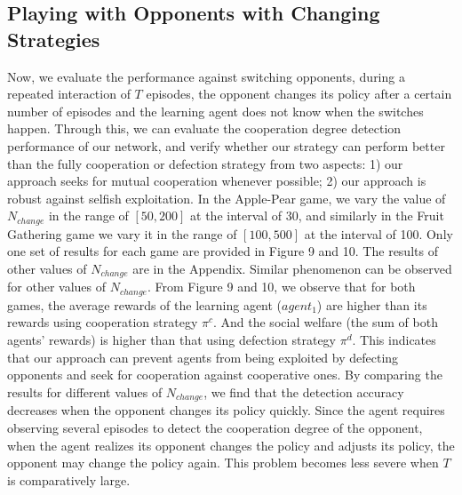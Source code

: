 \documentclass{article}
\begin{document}
\subsection{Playing with Opponents with Changing Strategies}
Now, we evaluate the performance against switching opponents, during a repeated interaction of $T$ episodes, the opponent changes its policy after a certain number of episodes and the learning agent does not know when the switches happen. Through this, we can evaluate the cooperation degree detection performance  of our network, and verify whether our strategy can perform better than the fully cooperation or defection strategy from two aspects: 1) our approach seeks for mutual cooperation whenever
possible; 2) our approach is robust against selfish exploitation.
In the Apple-Pear game, we vary the value of $N_{change}$ in the range of $[50, 200]$ at the interval of 30,
and similarly in the Fruit Gathering game we vary it in the range of $[100,500]$ at the interval of 100. Only one set of results for each game are provided in Figure 9 and 10. The results of other values of $N_{change}$ are in the Appendix. Similar phenomenon can be observed for other values of $N_{change}$. From Figure 9 and 10, we observe that for both games, the average rewards of the learning agent ($agent_1$) are higher than its rewards using cooperation strategy $\pi^c$.
And the social welfare (the sum of both agents' rewards)
is higher than that using defection strategy $\pi^d$. This indicates that our approach can prevent agents from being exploited by defecting opponents and seek for cooperation against cooperative ones.  By comparing the results for different values of $N_{change}$, we find that the detection accuracy decreases when the opponent changes its policy quickly. Since the agent requires observing several episodes to detect the cooperation degree of the opponent, when the agent realizes its opponent changes the policy and adjusts its policy, the opponent may change the policy again. This problem becomes less severe when $T$ is comparatively large.
\end{document}
